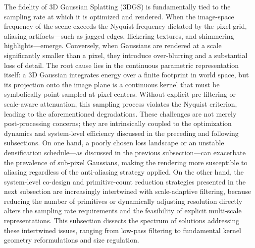 \documentclass[11pt,a4paper]{article}
\begin{document}
The fidelity of 3D Gaussian Splatting (3DGS) is fundamentally tied to the sampling rate at which it is optimized and rendered. When the image-space frequency of the scene exceeds the Nyquist frequency dictated by the pixel grid, aliasing artifacts---such as jagged edges, flickering textures, and shimmering highlights---emerge. Conversely, when Gaussians are rendered at a scale significantly smaller than a pixel, they introduce over-blurring and a substantial loss of detail. The root cause lies in the continuous parametric representation itself: a 3D Gaussian integrates energy over a finite footprint in world space, but its projection onto the image plane is a continuous kernel that must be symbolically point-sampled at pixel centers. Without explicit pre-filtering or scale-aware attenuation, this sampling process violates the Nyquist criterion, leading to the aforementioned degradations. These challenges are not merely post-processing concerns; they are intrinsically coupled to the optimization dynamics and system-level efficiency discussed in the preceding and following subsections. On one hand, a poorly chosen loss landscape or an unstable densification schedule---as discussed in the previous subsection---can exacerbate the prevalence of sub-pixel Gaussians, making the rendering more susceptible to aliasing regardless of the anti-aliasing strategy applied. On the other hand, the system-level co-design and primitive-count reduction strategies presented in the next subsection are increasingly intertwined with scale-adaptive filtering, because reducing the number of primitives or dynamically adjusting resolution directly alters the sampling rate requirements and the feasibility of explicit multi-scale representations. This subsection dissects the spectrum of solutions addressing these intertwined issues, ranging from low-pass filtering to fundamental kernel geometry reformulations and size regulation.
\end{document}
